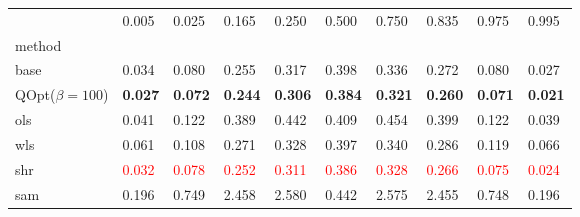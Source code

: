 \begin{tabular}{llllllllll}
\toprule
 & 0.005 & 0.025 & 0.165 & 0.250 & 0.500 & 0.750 & 0.835 & 0.975 & 0.995 \\
method &  &  &  &  &  &  &  &  &  \\
\midrule
base & 0.034 & 0.080 & 0.255 & 0.317 & 0.398 & 0.336 & 0.272 & 0.080 & 0.027 \\
\midrule
QOpt($\beta=100$) & \textbf{0.027} & \textbf{0.072} & \textbf{0.244} & \textbf{0.306} & \textbf{0.384} & \textbf{0.321} & \textbf{0.260} & \textbf{0.071} & \textbf{0.021} \\
ols & 0.041 & 0.122 & 0.389 & 0.442 & 0.409 & 0.454 & 0.399 & 0.122 & 0.039 \\
wls & 0.061 & 0.108 & 0.271 & 0.328 & 0.397 & 0.340 & 0.286 & 0.119 & 0.066 \\
shr & \textcolor{red}{0.032} & \textcolor{red}{0.078} & \textcolor{red}{0.252} & \textcolor{red}{0.311} & \textcolor{red}{0.386} & \textcolor{red}{0.328} & \textcolor{red}{0.266} & \textcolor{red}{0.075} & \textcolor{red}{0.024} \\
sam & 0.196 & 0.749 & 2.458 & 2.580 & 0.442 & 2.575 & 2.455 & 0.748 & 0.196 \\
\bottomrule
\end{tabular}